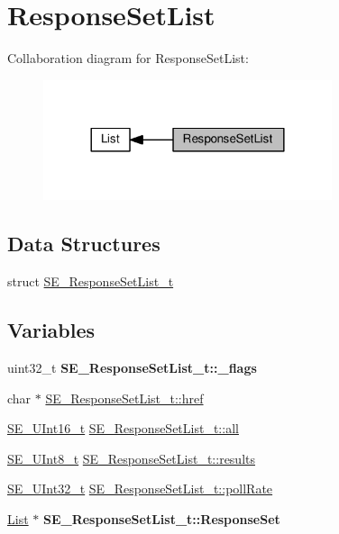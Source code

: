 \hypertarget{group__ResponseSetList}{}\section{Response\+Set\+List}
\label{group__ResponseSetList}
Collaboration diagram for Response\+Set\+List\+:\nopagebreak
\begin{figure}[H]
\begin{center}
\leavevmode
\includegraphics[width=240pt]{group__ResponseSetList}
\end{center}
\end{figure}
\subsection*{Data Structures}
\begin{DoxyCompactItemize}
\item 
struct \hyperlink{structSE__ResponseSetList__t}{S\+E\+\_\+\+Response\+Set\+List\+\_\+t}
\end{DoxyCompactItemize}
\subsection*{Variables}
\begin{DoxyCompactItemize}
\item 
\mbox{\label{group__ResponseSetList_ga948ed8926e5408e4614b269c52f7859f}} 
uint32\+\_\+t {\bfseries S\+E\+\_\+\+Response\+Set\+List\+\_\+t\+::\+\_\+flags}
\item 
char $\ast$ \hyperlink{group__ResponseSetList_gadc2f2a201658b2bf27072ae811b9b014}{S\+E\+\_\+\+Response\+Set\+List\+\_\+t\+::href}
\item 
\hyperlink{group__UInt16_gac68d541f189538bfd30cfaa712d20d29}{S\+E\+\_\+\+U\+Int16\+\_\+t} \hyperlink{group__ResponseSetList_gacd39a1a009fb2aa7adbea7016bfe6c29}{S\+E\+\_\+\+Response\+Set\+List\+\_\+t\+::all}
\item 
\hyperlink{group__UInt8_gaf7c365a1acfe204e3a67c16ed44572f5}{S\+E\+\_\+\+U\+Int8\+\_\+t} \hyperlink{group__ResponseSetList_gaa96307d02ec1a098b78dc3f11eedff51}{S\+E\+\_\+\+Response\+Set\+List\+\_\+t\+::results}
\item 
\hyperlink{group__UInt32_ga70bd4ecda3c0c85d20779d685a270cdb}{S\+E\+\_\+\+U\+Int32\+\_\+t} \hyperlink{group__ResponseSetList_gad0b2c3c48abf6ac9c5426cc6942d4b55}{S\+E\+\_\+\+Response\+Set\+List\+\_\+t\+::poll\+Rate}
\item 
\mbox{\label{group__ResponseSetList_gac4af653bfa431acfef684867beaf5500}} 
\hyperlink{structList}{List} $\ast$ {\bfseries S\+E\+\_\+\+Response\+Set\+List\+\_\+t\+::\+Response\+Set}
\end{DoxyCompactItemize}


